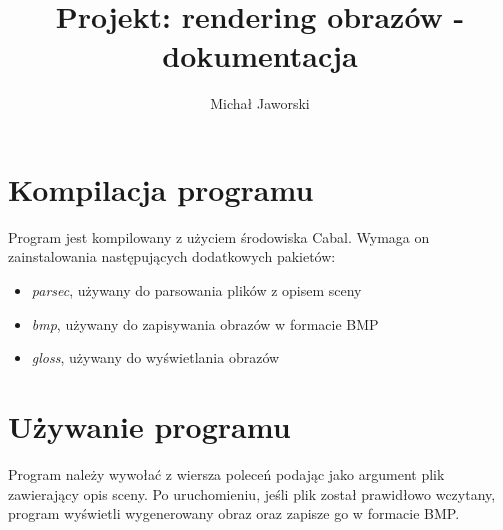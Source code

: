 \documentclass[11pt,a4paper]{article}
\title{\vspace{-2.0cm}\textbf{Projekt: rendering obrazów - dokumentacja}}
\author{Michał Jaworski}
\begin{document}
\maketitle
\section{Kompilacja programu}
Program jest kompilowany z użyciem środowiska Cabal. Wymaga on zainstalowania następujących dodatkowych pakietów:
\begin{itemize}
\item\textit{parsec}, używany do parsowania plików z opisem sceny
\item\textit{bmp}, używany do zapisywania obrazów w formacie BMP
\item\textit{gloss}, używany do wyświetlania obrazów
\end{itemize}
\section{Używanie programu}
Program należy wywołać z wiersza poleceń podając jako argument plik zawierający opis sceny. Po uruchomieniu, jeśli plik został prawidłowo wczytany, program wyświetli wygenerowany obraz oraz zapisze go w formacie BMP.
\end{document}
